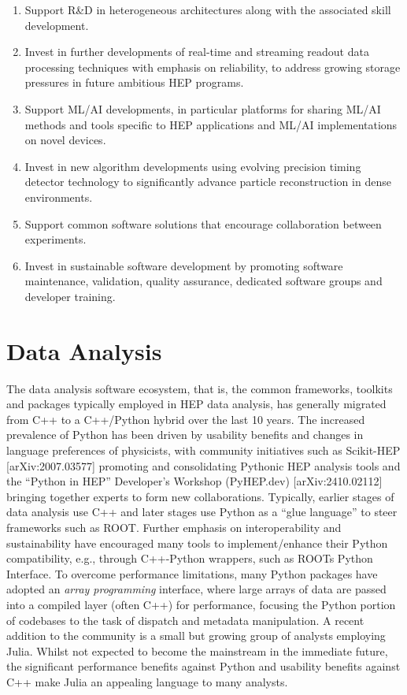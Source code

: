 \documentclass[10pt,a4paper]{article}
\begin{document}
\begin{enumerate}
\def\labelenumi{\arabic{enumi}.}
\item
  Support R\&D in heterogeneous architectures along with the associated
  skill development.
\item
  Invest in further developments of real-time and streaming readout data
  processing techniques with emphasis on reliability, to address growing
  storage pressures in future ambitious HEP programs.
\item
  Support ML/AI developments, in particular platforms for sharing ML/AI
  methods and tools specific to HEP applications and ML/AI
  implementations on novel devices.
\item
  Invest in new algorithm developments using evolving precision timing
  detector technology to significantly advance particle reconstruction
  in dense environments.
\item
  Support common software solutions that encourage collaboration between
  experiments.
\item
  Invest in sustainable software development by promoting software
  maintenance, validation, quality assurance, dedicated software groups
  and developer training.
\end{enumerate}

\section{Data Analysis}\label{data-analysis}

The data analysis software ecosystem, that is, the common frameworks,
toolkits and packages typically employed in HEP data analysis, has
generally migrated from C++ to a C++/Python hybrid over the last 10
years. The increased prevalence of Python has been driven by usability
benefits and changes in language preferences of physicists, with
community initiatives such as Scikit-HEP {[}arXiv:2007.03577{]}
promoting and consolidating Pythonic HEP analysis tools and the ``Python
in HEP'' Developer's Workshop (PyHEP.dev) {[}arXiv:2410.02112{]}
bringing together experts to form new collaborations. Typically, earlier
stages of data analysis use C++ and later stages use Python as a ``glue
language'' to steer frameworks such as ROOT. Further emphasis on
interoperability and sustainability have encouraged many tools to
implement/enhance their Python compatibility, e.g., through C++-Python
wrappers, such as ROOT\textquotesingle s Python Interface. To overcome
performance limitations, many Python packages have adopted an
\emph{array programming} interface, where large arrays of data are
passed into a compiled layer (often C++) for performance, focusing the
Python portion of codebases to the task of dispatch and metadata
manipulation. A recent addition to the community is a small but growing
group of analysts employing Julia. Whilst not expected to become the
mainstream in the immediate future, the significant performance benefits
against Python and usability benefits against C++ make Julia an
appealing language to many analysts.
\end{document}
